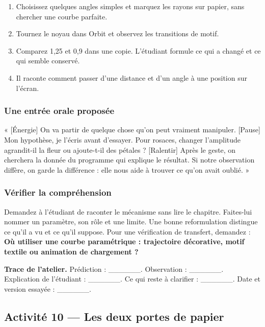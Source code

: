 \documentclass[
  canadien,
  11pt,
  letterpaper,
]{article}
\providecommand{\tightlist}{%
  \setlength{\itemsep}{0pt}\setlength{\parskip}{0pt}}
\begin{document}
\begin{enumerate}
\def\labelenumi{\arabic{enumi}.}
\tightlist
\item
  Choisissez quelques angles simples et marquez les rayons sur papier,
  sans chercher une courbe parfaite.
\item
  Tournez le noyau dans Orbit et observez les transitions de motif.
\item
  Comparez 1,25 et 0,9 dans une copie. L'étudiant formule ce qui a
  changé et ce qui semble conservé.
\item
  Il raconte comment passer d'une distance et d'un angle à une position
  sur l'écran.
\end{enumerate}

\subsubsection{Une entrée orale
proposée}\label{une-entruxe9e-orale-proposuxe9e-8}

« {[}Énergie{]} On va partir de quelque chose qu'on peut vraiment
manipuler. {[}Pause{]} Mon hypothèse, je l'écris avant d'essayer. Pour
rosaces, changer l'amplitude agrandit-il la fleur ou ajoute-t-il des
pétales ? {[}Ralentir{]} Après le geste, on cherchera la donnée du
programme qui explique le résultat. Si notre observation diffère, on
garde la différence : elle nous aide à trouver ce qu'on avait oublié. »

\subsubsection{Vérifier la
compréhension}\label{vuxe9rifier-la-compruxe9hension-8}

Demandez à l'étudiant de raconter le mécanisme sans lire le chapitre.
Faites-lui nommer un paramètre, son rôle et une limite. Une bonne
reformulation distingue ce qu'il a vu et ce qu'il suppose. Pour une
vérification de transfert, demandez : \textbf{Où utiliser une courbe
paramétrique : trajectoire décorative, motif textile ou animation de
chargement ?}

\textbf{Trace de l'atelier.} Prédiction : \_\_\_\_\_\_. Observation :
\_\_\_\_\_\_. Explication de l'étudiant : \_\_\_\_\_\_. Ce qui reste à
clarifier : \_\_\_\_\_\_. Date et version essayée : \_\_\_\_\_\_.

\subsection{Activité 10 --- Les deux portes de
papier}\label{activituxe9-10-les-deux-portes-de-papier}
\end{document}
